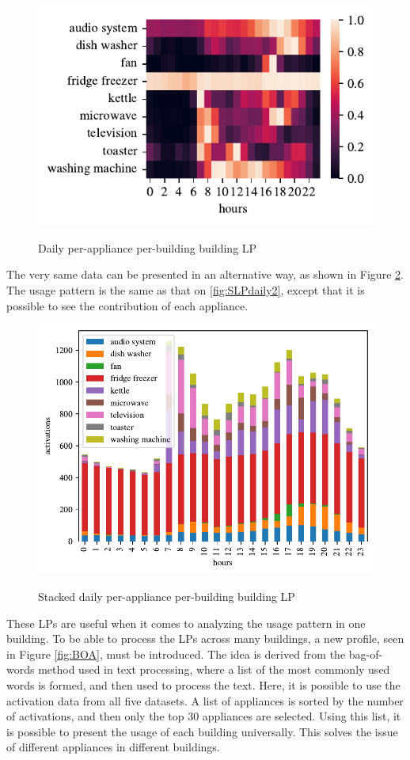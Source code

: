 \begin{figure}[H]
	\centering
	\caption{Daily per-appliance per-building building LP}
	\includegraphics[]{../Figures/LPS/PHPA_profile_for_building.pdf}
	\label{fig:PHPA}
\end{figure}

The very same data can be presented in an alternative way, as shown in Figure \ref{fig:stack}.
The usage pattern is the same as that on \ref{fig:SLPdaily2}, except that it is possible to see the contribution of each appliance.

\begin{figure}[H]
	\centering
	\caption{Stacked daily per-appliance per-building building LP}
	\includegraphics[width=.8\textwidth]{../Figures/LPS/stacked_LP.pdf}
	\label{fig:stack}
\end{figure}  
 
These LPs are useful when it comes to analyzing the usage pattern in one building.
To be able to process the LPs across many buildings, a new profile, seen in Figure \ref{fig:BOA}, must be introduced.
The idea is derived from the bag-of-words method used in text processing, where a list of the most commonly used words is formed, and then used to process the text. 
Here, it is possible to use the activation data from all five datasets. 
A list of appliances is sorted by the number of activations, and then only the top 30 appliances are selected. 
Using this list, it is possible to present the usage of each building universally. 
This solves the issue of different appliances in different buildings.


